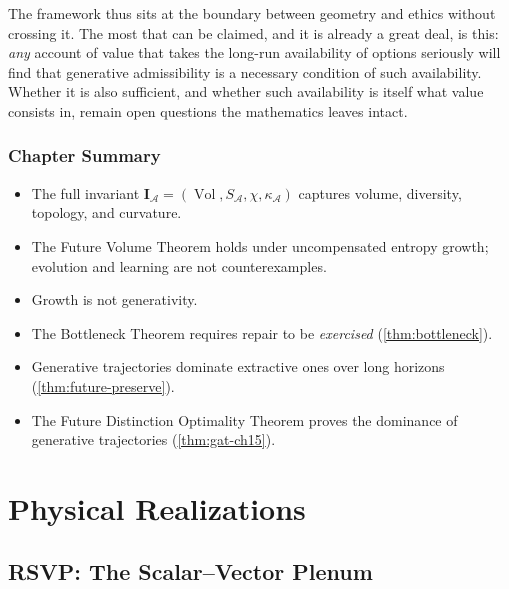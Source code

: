 \documentclass[12pt,twoside,openright]{book}
\newcommand{\adm}{\mathcal{A}}
\newcommand{\Vol}{\operatorname{Vol}}
\newenvironment{chapsummary}{%
  \begin{tcolorbox}[colback=DistBlue!5,colframe=DistBlue,
    title={\faBookOpen\enspace Summary},
    fonttitle=\sffamily\bfseries\color{white},
    attach boxed title to top left={yshift=-2mm,xshift=4mm},
    boxed title style={colback=DistBlue,rounded corners}]
  \begin{itemize}[nosep,leftmargin=*]}{%
  \end{itemize}\end{tcolorbox}}
\newcounter{exercise}[chapter]
\begin{document}
The framework thus sits at the boundary between geometry and
ethics without crossing it. The most that can be claimed,
and it is already a great deal, is this: \emph{any} account
of value that takes the long-run availability of options
seriously will find that generative admissibility is a
necessary condition of such availability. Whether it is also
sufficient, and whether such availability is itself what
value consists in, remain open questions the mathematics
leaves intact.

\section*{Chapter Summary}
\begin{chapsummary}
  \item The full invariant
        $\mathbf{I}_\adm=(\Vol,S_\adm,\chi,\kappa_\adm)$
        captures volume, diversity, topology, and curvature.
  \item The Future Volume Theorem holds under uncompensated
        entropy growth; evolution and learning are not
        counterexamples.
  \item Growth is not generativity.
  \item The Bottleneck Theorem requires repair to be
        \emph{exercised} (\cref{thm:bottleneck}).
  \item Generative trajectories dominate extractive ones
        over long horizons (\cref{thm:future-preserve}).
  \item The Future Distinction Optimality Theorem proves
        the dominance of generative trajectories
        (\cref{thm:gat-ch15}).
\end{chapsummary}

\part{Physical Realizations}


\chapter{RSVP: The Scalar--Vector Plenum}
\label{ch:rsvp}
\end{document}
